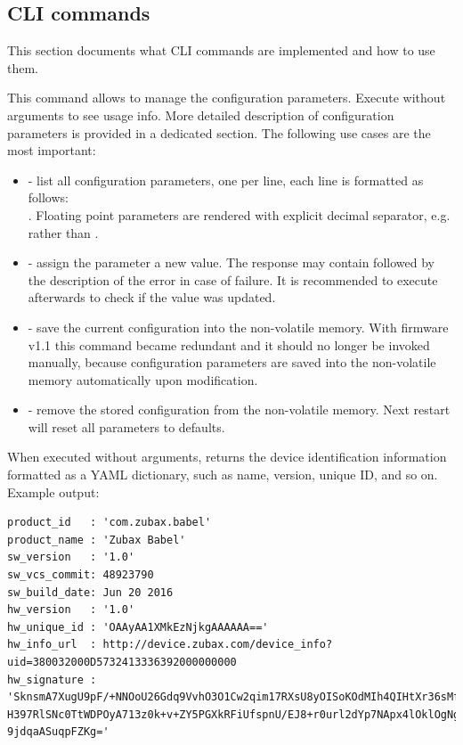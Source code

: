 \documentclass{zubaxdoc}
\begin{document}
\subsection{CLI commands}

This section documents what CLI commands are implemented and how to use them.


This command allows to manage the configuration parameters. Execute without arguments to see usage info. More detailed description of configuration parameters is provided in a dedicated section. The following use cases are the most important:

\begin{itemize}
\item {} - list all configuration parameters, one per line, each line is formatted as follows:\\ . Floating point parameters are rendered with explicit decimal separator, e.g.   rather than .
\item {} - assign the parameter a new value. The response may contain  followed by the description of the error in case of failure. It is recommended to execute  afterwards to check if the value was updated.
\item {} - save the current configuration into the non-volatile memory. With firmware v1.1 this command became redundant and it should no longer be invoked manually,  because configuration parameters are saved into the non-volatile memory automatically upon modification.
\item {} - remove the stored configuration from the non-volatile memory. Next restart will reset all parameters to defaults.
\end{itemize}


When executed without arguments, returns the device identification information formatted as a YAML dictionary, such as name, version, unique ID, and so on. Example output:

\begin{verbatim}
product_id   : 'com.zubax.babel'
product_name : 'Zubax Babel'
sw_version   : '1.0'
sw_vcs_commit: 48923790
sw_build_date: Jun 20 2016
hw_version   : '1.0'
hw_unique_id : 'OAAyAA1XMkEzNjkgAAAAAA=='
hw_info_url  : http://device.zubax.com/device_info?uid=380032000D5732413336392000000000
hw_signature : 'SknsmA7XugU9pF/+NNOoU26Gdq9VvhO3O1Cw2qim17RXsU8yOISoKOdMIh4QIHtXr36sMfx
H397RlSNc0TtWDPOyA713z0k+v+ZY5PGXkRFiUfspnU/EJ8+r0url2dYp7NApx4lOklOgNgHrGCA6lPxA8UqoW
9jdqaASuqpFZKg='
\end{verbatim}
\end{document}
